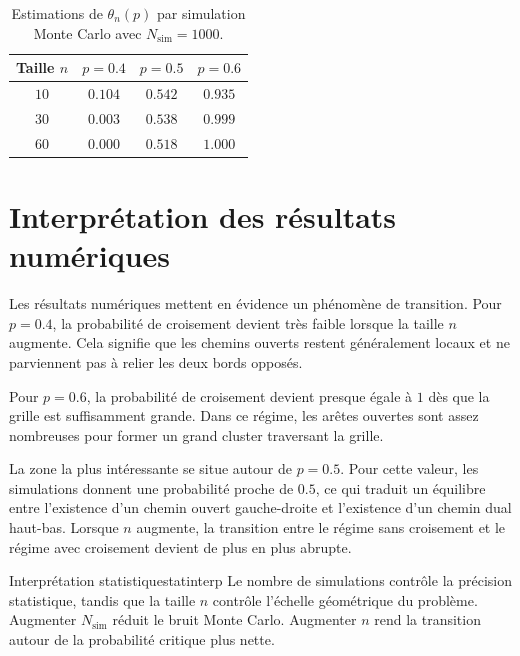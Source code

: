 \documentclass[11pt,a4paper]{report}
\begin{document}
\begin{table}[H]
\centering
\begin{tabular}{c|ccc}
\toprule
\textbf{Taille $n$} & \textbf{$p=0.4$} & \textbf{$p=0.5$} & \textbf{$p=0.6$} \\
\midrule
$10$ & $0.104$ & $0.542$ & $0.935$ \\
$30$ & $0.003$ & $0.538$ & $0.999$ \\
$60$ & $0.000$ & $0.518$ & $1.000$ \\
\bottomrule
\end{tabular}
\caption{Estimations de $\theta_n(p)$ par simulation Monte Carlo avec $N_{\mathrm{sim}}=1000$.}
\label{tab:numerical-results}
\end{table}

\section{Interprétation des résultats numériques}

Les résultats numériques mettent en évidence un phénomène de transition. Pour $p=0.4$, la probabilité de croisement devient très faible lorsque la taille $n$ augmente. Cela signifie que les chemins ouverts restent généralement locaux et ne parviennent pas à relier les deux bords opposés.

Pour $p=0.6$, la probabilité de croisement devient presque égale à $1$ dès que la grille est suffisamment grande. Dans ce régime, les arêtes ouvertes sont assez nombreuses pour former un grand cluster traversant la grille.

La zone la plus intéressante se situe autour de $p=0.5$. Pour cette valeur, les simulations donnent une probabilité proche de $0.5$, ce qui traduit un équilibre entre l'existence d'un chemin ouvert gauche-droite et l'existence d'un chemin dual haut-bas. Lorsque $n$ augmente, la transition entre le régime sans croisement et le régime avec croisement devient de plus en plus abrupte.

\begin{remarkbox}{Interprétation statistique}{statinterp}
Le nombre de simulations contrôle la précision statistique, tandis que la taille $n$ contrôle l'échelle géométrique du problème. Augmenter $N_{\mathrm{sim}}$ réduit le bruit Monte Carlo. Augmenter $n$ rend la transition autour de la probabilité critique plus nette.
\end{remarkbox}

\end{document}
